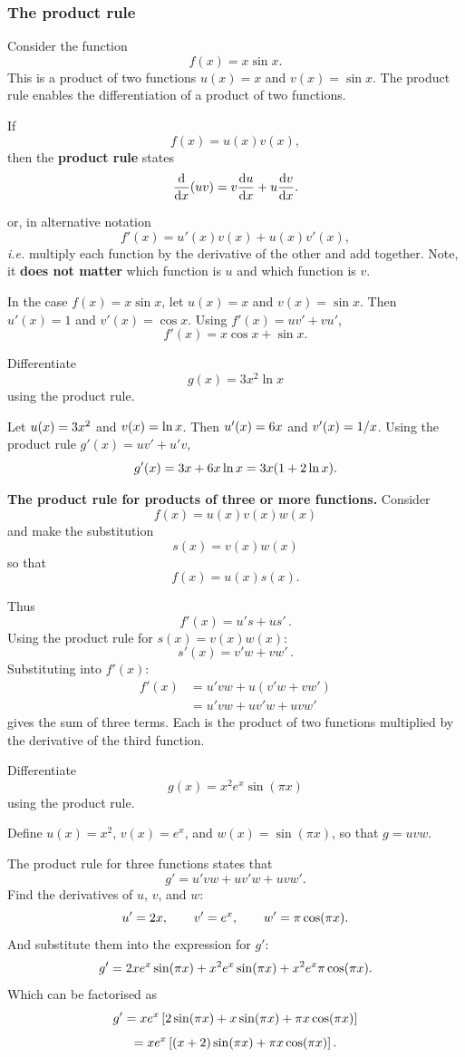 \subsubsection{The product rule}

Consider the function
\[
f(x)=x\sin x.
\]
This is a product of two functions $u(x)=x$ and $v(x)=\sin x$. The product rule enables the differentiation of a product of two functions.

If
\[
f(x)=u(x)v(x),
\]
then the \textbf{product rule} states
\begin{equation}
    \frac{{\rm d} }{{\rm d} x}(uv)=v\frac{{\rm d}u}{{\rm d}x}+u\frac{{\rm d}v}{{\rm d}x}.
\end{equation}

or, in alternative notation
\[
f'(x)=u'(x)v(x)+u(x)v'(x),
\]
\emph{i.e.} multiply each function by the derivative of the other and add together. Note, it \textbf{does not matter} which function is $u$ and which function is $v$.

In the case $f(x)=x\sin x$, let $u(x)=x$ and $v(x)=\sin x$. Then $u'(x)=1$ and $v'(x)=\cos x$. Using $f'(x)=uv'+vu'$,
\[
f'(x)=x\cos x+\sin x.
\]

\goodbreak
\begin{example}[Lecture]
Differentiate
\[
g(x)=3x^2\ln x
\]
using the product rule.
\end{example}
%
\begin{solution}
Let $u(x)=3x^2$ and $v(x)=\ln x$. Then $u'(x)=6x$ and $v'(x)=1/x$. Using the product rule $g'(x)=uv'+u'v$,
\[
g'(x)=3x+6x\ln x=3x(1+2\ln x).
\]
\end{solution}

\textbf{The product rule for products of three or more functions.} Consider
\[
f(x)=u(x)v(x)w(x)
\]
and make the substitution
\[
s(x)=v(x)w(x)
\]
so that
\[
f(x)=u(x)s(x).
\]

Thus
\[
f'(x)=u's+us'\, .
\]
Using the product rule for $s(x)=v(x)w(x)$:
\[
s'(x)=v'w+vw'\,.
\]
Substituting into $f'(x)$:
\begin{align}
f'(x)&=u'vw+u(v'w+vw')\\
&=u'vw+uv'w+uvw'
\end{align}
gives the sum of three terms. Each is the product of two functions multiplied by the derivative of the third function.

\goodbreak
\begin{example}[Video]
Differentiate
\[
g(x)=x^2e^x\sin(\pi x)
\]
using the product rule.
\end{example}
%
\begin{solution}
Define $u(x)=x^2$, $v(x)=e^x$, and $w(x)=\sin(\pi x)$, so that $g=uvw$.

The product rule for three functions states that
\[
g'=u'vw+uv'w+uvw'.
\]
Find the derivatives of $u$, $v$, and $w$:
\[
u'=2x,
\qquad
v'=e^x,
\qquad
w'=\pi\cos(\pi x).
\]
And substitute them into the expression for $g'$:
\[
g'=2xe^x\sin(\pi x)
+x^2e^x\sin(\pi x)
+x^2e^x\pi\cos(\pi x).
\]
Which can be factorised as
\[
g'=xe^x\left[2\sin(\pi x)+x\sin(\pi x)+\pi x\cos(\pi x)\right]
\]
\[
=xe^x\left[(x+2)\sin(\pi x)+\pi x\cos(\pi x)\right].
\]
\end{solution}

